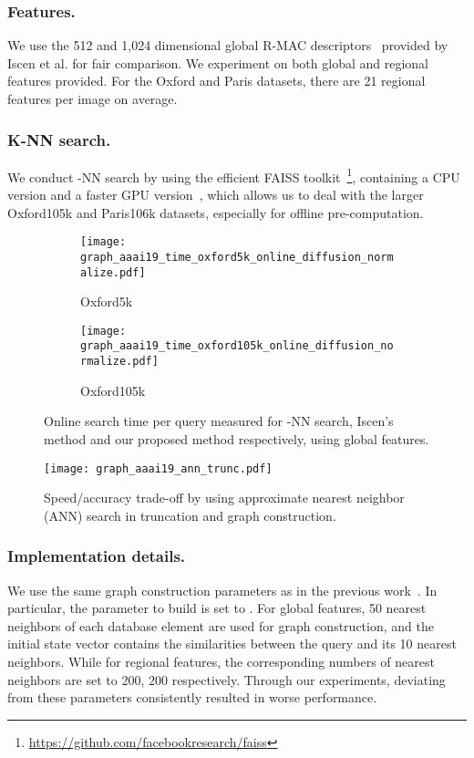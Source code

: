 \documentclass[letterpaper]{article} \usepackage{aaai19}  \usepackage{times}  \usepackage{helvet}  \usepackage{courier}  \usepackage{url}  \usepackage{graphicx}  \frenchspacing  \setlength{\pdfpagewidth}{8.5in}  \setlength{\pdfpageheight}{11in}
\begin{document}
\subsubsection{Features.}
We use the 512 and 1,024 dimensional global R-MAC descriptors~\cite{tolias2015particular,gordo2016deep} provided by Iscen et al. for fair comparison.
We experiment on both global and regional features provided.
For the Oxford and Paris datasets, there are 21 regional features per image on average.  


\subsubsection{K-NN search.}
We conduct -NN search by using the efficient FAISS toolkit~\footnote{\url{https://github.com/facebookresearch/faiss}}, containing a CPU version and a faster GPU version~\cite{johnson2017billion}, which allows us to deal with the larger Oxford105k and Paris106k datasets, especially for offline pre-computation.

\begin{figure}[t]
  \centering
  \begin{subfigure}[b]{\linewidth}
    \texttt{[image: graph\_aaai19\_time\_oxford5k\_online\_diffusion\_normalize.pdf]}
    \caption{Oxford5k}
  \end{subfigure}
  \begin{subfigure}[b]{\linewidth}
    \texttt{[image: graph\_aaai19\_time\_oxford105k\_online\_diffusion\_normalize.pdf]}
    \caption{Oxford105k}
  \end{subfigure}
  \caption{Online search time per query measured for -NN search, Iscen's method and our proposed method respectively, using global features.}
  \label{fig:time}
\vspace{-3mm}
\end{figure}

\begin{figure}[t]
  \centering
  \texttt{[image: graph\_aaai19\_ann\_trunc.pdf]}
  \caption{Speed/accuracy trade-off by using approximate nearest neighbor (ANN) search in truncation and graph construction.}
  \label{fig:offline}
\vspace{-3mm}
\end{figure}


\subsubsection{Implementation details.}
We use the same graph construction parameters as in the previous work~\cite{iscen2017efficient}.
In particular, the parameter  to build  is set to .
For global features, 50 nearest neighbors of each database element are used for graph construction, and the initial state vector contains the similarities between the query and its 10 nearest neighbors.
While for regional features, the corresponding numbers of nearest neighbors are set to 200, 200 respectively.
Through our experiments, deviating from these parameters consistently resulted in worse performance.
\end{document}
